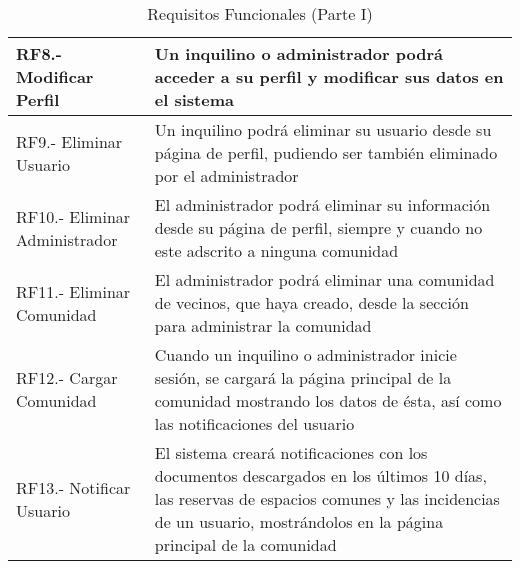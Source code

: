 \begin{appendices}
\begin{table}[H]
\begin{center}
\begin{tabular}{| p{5cm} | p{10cm} |}
			RF8.- Modificar Perfil &  Un inquilino o administrador podrá acceder a su perfil y modificar sus datos
			en el sistema \\ \hline
			RF9.- Eliminar Usuario & Un inquilino podrá eliminar su usuario desde su página de perfil, pudiendo
			ser también eliminado por el administrador  \\ \hline
			RF10.- Eliminar Administrador & El administrador podrá eliminar su información desde su página de perfil, siempre y cuando no este adscrito a ninguna comunidad  \\ \hline
			RF11.- Eliminar Comunidad &  El administrador podrá eliminar una comunidad de vecinos, que
			haya creado, desde la sección para administrar la comunidad  \\ \hline
			RF12.- Cargar Comunidad & Cuando un inquilino o administrador inicie sesión, se cargará la página
			principal de la comunidad mostrando los datos de ésta, así como las notificaciones del usuario  \\ \hline
			RF13.- Notificar Usuario &  El sistema creará notificaciones con los documentos descargados en
			los últimos 10 días, las reservas de espacios comunes y las incidencias de un usuario, mostrándolos
			en la página principal de la comunidad  \\ \hline
		\end{tabular}	
		\egroup
		\caption{Requisitos Funcionales (Parte I)}	
	\end{center}
\end{table}  


\end{appendices}
